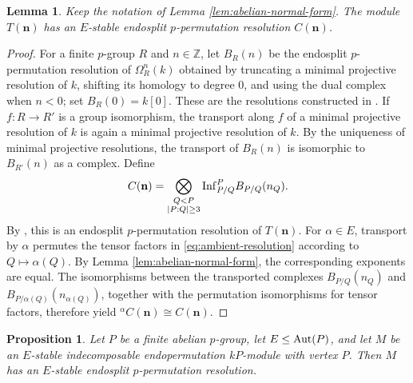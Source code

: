 \documentclass[preprint,12pt,3p]{elsarticle}
\newtheorem{lemma}[theorem]{Lemma}
\newtheorem{proposition}[theorem]{Proposition}%
\def\Inf{{\rm Inf}}
\def\Aut{{\rm Aut}}
\def\Z{\mathbb{Z}}
\begin{document}
\begin{lemma}\label{lem:ambient-resolution}
Keep the notation of Lemma \ref{lem:abelian-normal-form}. The module $T(\mathbf n)$ has an $E$-stable endosplit $p$-permutation resolution $C(\mathbf n)$.
\end{lemma}

\begin{proof}
For a finite $p$-group $R$ and $n\in\Z$, let $B_R(n)$ be the endosplit $p$-permutation resolution of $\Omega_R^n(k)$ obtained by truncating a minimal projective resolution of $k$, shifting its homology to degree $0$, and using the dual complex when $n<0$; set $B_R(0)=k[0]$. These are the resolutions constructed in \cite[Proposition 7.11.7 and Corollary 7.11.8]{Lin18b}. If $f:R\to R'$ is a group isomorphism, the transport along $f$ of a minimal projective resolution of $k$ is again a minimal projective resolution of $k$. By the uniqueness of minimal projective resolutions, the transport of $B_R(n)$ is isomorphic to $B_{R'}(n)$ as a complex. Define
\begin{equation}\label{eq:ambient-resolution}
 C(\mathbf n)=\bigotimes_{\substack{Q<P\\|P:Q|\geq3}}\Inf_{P/Q}^P B_{P/Q}(n_Q).
\end{equation}
By \cite[Proposition 7.11.6 (ii)]{Lin18b}, this is an endosplit $p$-permutation resolution of $T(\mathbf n)$. For $\alpha\in E$, transport by $\alpha$ permutes the tensor factors in \eqref{eq:ambient-resolution} according to $Q\mapsto\alpha(Q)$. By Lemma \ref{lem:abelian-normal-form}, the corresponding exponents are equal. The isomorphisms between the transported complexes $B_{P/Q}(n_Q)$ and $B_{P/\alpha(Q)}(n_{\alpha(Q)})$, together with the permutation isomorphisms for tensor factors, therefore yield ${}^\alpha C(\mathbf n)\cong C(\mathbf n)$.
\end{proof}

\begin{proposition}\label{prop:abelian-stable-resolution}
Let $P$ be a finite abelian $p$-group, let $E\leq\Aut(P)$, and let $M$ be an $E$-stable indecomposable endopermutation $kP$-module with vertex $P$. Then $M$ has an $E$-stable endosplit $p$-permutation resolution.
\end{proposition}
\end{document}
